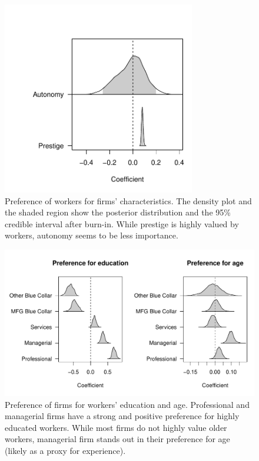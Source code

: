 \begin{figure}[!ht]
  \centering
  \includegraphics[width=0.75\textwidth,keepaspectratio]{../figure/labor_occ5_alpha}
  \caption[Workers' preference in the US labor market.]{Preference of workers for firms' characteristics. The density plot and the
    shaded region show the posterior distribution and the 95\% credible interval
    after burn-in. While prestige is highly valued by workers, autonomy seems to
    be less importance.}
  \label{fig:labor_occ5_alpha}
\end{figure}

\begin{figure}[!ht]
  \centering
  \includegraphics[width=\textwidth,keepaspectratio]{../figure/labor_occ5_beta_educ_age}
  \caption[Firms' preference in the US labor market]{Preference of firms for workers' education and
    age. Professional and managerial firms have a strong and positive preference
  for highly educated workers. While most firms do not highly value older workers,
  managerial firm stands out in their preference for age (likely as a
  proxy for experience).}
  \label{fig:labor_occ5_beta_educ_age}
\end{figure}


